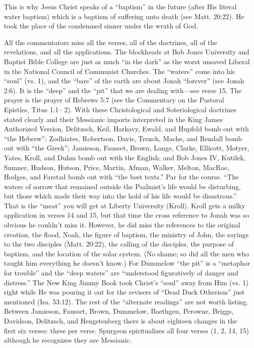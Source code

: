 {\begin{compactenum}
\item This is why Jesus Christ speaks of a “baptism” in the future (after His literal water baptism) which is a baptism of suffering unto death (see Matt. 20:22). He took the place of the condemned sinner under the wrath of God.
\end{compactenum}
All the commentators miss all the verses, all of
the doctrines, all of the revelations, and all the
applications. The blockheads at Bob Jones
University and Baptist Bible College are just as
much “in the dark” as the worst unsaved Liberal in
the National Council of Communist Churches.
The “waters” come into his “soul” (vs. 1), and
the “bars” of the earth are about Jonah “forever”
(see Jonah 2:6). It is the “deep” and the “pit”
that we are dealing with—see verse 15. The
prayer is the prayer of Hebrews 5:7 (see the
Commentary on the Pastoral Epistles, Titus 1:1–
2).
With these Christological and Soteriological
doctrines stated clearly and their Messianic
imports interpreted in the King James Authorized
Version, Delitzsch, Keil, Harkavy, Ewald, and
Hupfeld bomb out with “the Hebrew”; Zodhiates,
Robertson, Davis, Trench, Mache, and Rendall
bomb out with “the Greek”; Jamieson, Fausset,
Brown, Lange, Clarke, Ellicott, Motyer, Yates,
Kroll, and Duhm bomb out with the English; and
Bob Jones IV, Kutilek, Sumner, Hudson, Hutson,
Price, Martin, Afman, Walker, Melton, MacRae,
Hodges, and Farstad bomb out with “the best
texts.”
Par for the course.
“The waters of sorrow that remained outside
the Psalmist’s life would be disturbing, but those
which made their way into the hold of his life
would be disastrous.”
That is the “meat” you will get at Liberty
University (Kroll). Kroll gets a milky application
in verses 14 and 15, but that time the cross
reference to Jonah was so obvious he couldn’t
miss it. However, he did miss the references to the
original creation, the flood, Noah, the figure of
baptism, the ministry of John, the sayings to the
two disciples (Matt. 20:22), the calling of the
disciples, the purpose of baptism, and the location
of the solar system. (No shame; so did all the men
who taught him everything he doesn’t know.)
For Dummelow “the pit” is a “metaphor for
trouble” and the “deep waters” are “understood
figuratively of danger and distress.” The New King
Jimmy Book took Christ’s “soul” away from Him
(vs. 1) right while He was pouring it out for the
revisers of “Dead Duck Otherism” just mentioned
(Isa. 53:12). The rest of the “alternate readings”
are not worth listing. Between Jamieson, Fausset,
Brown, Dummelow, Baethgen, Perowne, Briggs,
Davidson, Delitzsch, and Hengstenberg there is
about eighteen changes in the first six verses: three
per verse. Spurgeon spiritualizes all four verses (1,
2, 14, 15) although he recognizes they are
Messianic.}
